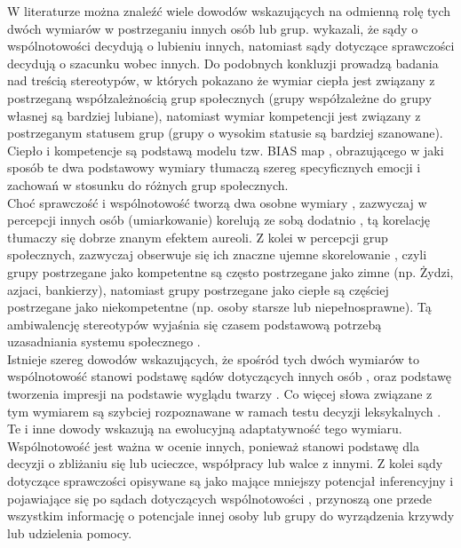 \documentclass[man]{apa6}
\begin{document}
W literaturze można znaleźć wiele dowodów wskazujących na odmienną rolę tych dwóch wymiarów w postrzeganiu innych osób lub grup. \textcite{wojciszke2009two} wykazali, że sądy o wspólnotowości decydują o lubieniu innych, natomiast sądy dotyczące sprawczości decydują o szacunku wobec innych. Do podobnych konkluzji prowadzą badania \textcite{fiske1999dis} nad treścią stereotypów, w których pokazano że wymiar ciepła jest związany z postrzeganą współzależnością grup społecznych (grupy współzależne do grupy własnej są bardziej lubiane), natomiast wymiar kompetencji jest związany z postrzeganym statusem grup (grupy o wysokim statusie są bardziej szanowane). Ciepło i kompetencje są podstawą modelu tzw. BIAS map \parencite{cuddy2007bias}, obrazującego w jaki sposób te dwa podstawowy wymiary tłumaczą szereg specyficznych emocji i zachowań w stosunku do różnych grup społecznych.\\

Choć sprawczość i wspólnotowość tworzą dwa osobne wymiary \parencite{rosenberg1968multidimensional}, zazwyczaj w percepcji innych osób (umiarkowanie) korelują ze sobą dodatnio \parencite{judd2005fundamental}, tą korelację tłumaczy się dobrze znanym efektem aureoli. Z kolei w percepcji grup społecznych, zazwyczaj obserwuje się ich znaczne ujemne skorelowanie \parencite{fiske1999dis}, czyli grupy postrzegane jako kompetentne są często postrzegane jako zimne (np. Żydzi, azjaci, bankierzy), natomiast grupy postrzegane jako ciepłe są częściej postrzegane jako niekompetentne (np. osoby starsze lub niepełnosprawne). Tą ambiwalencję stereotypów wyjaśnia się czasem podstawową potrzebą uzasadniania systemu społecznego \parencite[patrz,][]{kay2003complementary}.\\

Istnieje szereg dowodów wskazujących, że spośród tych dwóch wymiarów to wspólnotowość stanowi podstawę sądów dotyczących innych osób \parencite[np.,][]{wojciszke1998dominance}, oraz podstawę tworzenia impresji na podstawie wyglądu twarzy \parencite{willis2006first}. Co więcej słowa związane z tym wymiarem są szybciej rozpoznawane w ramach testu decyzji leksykalnych \parencite{ybarra2001young}. Te i inne dowody wskazują na ewolucyjną adaptatywność tego wymiaru. Wspólnotowość jest ważna w ocenie innych, ponieważ stanowi podstawę dla decyzji o zbliżaniu się lub ucieczce, współpracy lub walce z innymi. Z kolei sądy dotyczące sprawczości opisywane są jako mające mniejszy potencjał inferencyjny i pojawiające się po sądach dotyczących wspólnotowości \parencite[np.,][]{fiske2007universal}, przynoszą one przede wszystkim informację o potencjale innej osoby lub grupy do wyrządzenia krzywdy lub udzielenia pomocy.\\
\end{document}
